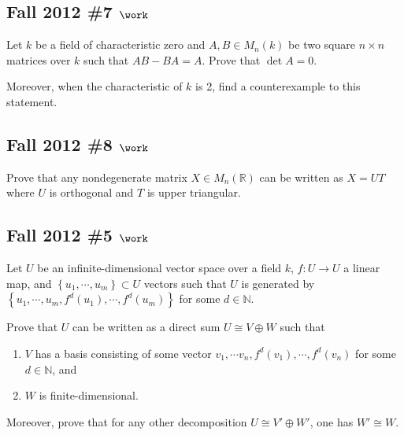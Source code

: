 \hypertarget{fall-2012-7-work}{%
\subsection{\texorpdfstring{Fall 2012 \#7
\(\work\)}{Fall 2012 \#7 \textbackslash work}}\label{fall-2012-7-work}}

Let \(k\) be a field of characteristic zero and \(A, B \in M_n(k)\) be
two square \(n\times n\) matrices over \(k\) such that \(AB - BA = A\).
Prove that \(\det A = 0\).

Moreover, when the characteristic of \(k\) is 2, find a counterexample
to this statement.

\hypertarget{fall-2012-8-work}{%
\subsection{\texorpdfstring{Fall 2012 \#8
\(\work\)}{Fall 2012 \#8 \textbackslash work}}\label{fall-2012-8-work}}

Prove that any nondegenerate matrix \(X\in M_n({\mathbb{R}})\) can be
written as \(X = UT\) where \(U\) is orthogonal and \(T\) is upper
triangular.

\hypertarget{fall-2012-5-work}{%
\subsection{\texorpdfstring{Fall 2012 \#5
\(\work\)}{Fall 2012 \#5 \textbackslash work}}\label{fall-2012-5-work}}

Let \(U\) be an infinite-dimensional vector space over a field \(k\),
\(f: U\to U\) a linear map, and
\(\left\{{u_1, \cdots, u_m}\right\} \subset U\) vectors such that \(U\)
is generated by
\(\left\{{u_1, \cdots, u_m, f^d(u_1), \cdots, f^d(u_m)}\right\}\) for
some \(d\in {\mathbb{N}}\).

Prove that \(U\) can be written as a direct sum \(U \cong V\oplus W\)
such that

\begin{enumerate}
\def\labelenumi{\arabic{enumi}.}
\tightlist
\item
  \(V\) has a basis consisting of some vector
  \(v_1, \cdots v_n, f^d(v_1), \cdots, f^d(v_n)\) for some
  \(d\in {\mathbb{N}}\), and
\item
  \(W\) is finite-dimensional.
\end{enumerate}

Moreover, prove that for any other decomposition
\(U \cong V' \oplus W'\), one has \(W' \cong W\).

